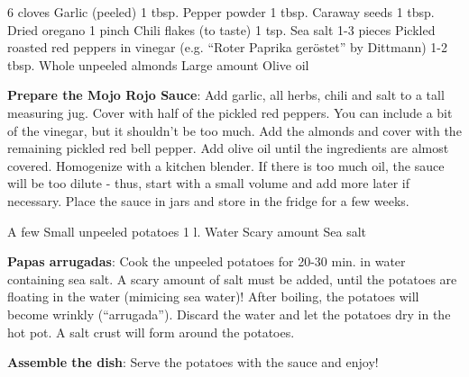 \documentclass{article}
\begin{document}

\dishType{\maindish}
\dishOther{\meat}

\begin{step}
6 cloves Garlic (peeled)
1 tbsp. Pepper powder
1 tbsp. Caraway seeds
1 tbsp. Dried oregano
1 pinch Chili flakes (to taste)
1 tsp. Sea salt
1-3 pieces Pickled roasted red peppers in vinegar (e.g. “Roter Paprika geröstet” by Dittmann)
1-2 tbsp. Whole unpeeled almonds
Large amount Olive oil


\method
\textbf{Prepare the Mojo Rojo Sauce}: Add garlic, all herbs, chili and salt to a tall measuring jug. Cover with half of the pickled red peppers. You can include a bit of the vinegar, but it shouldn't be too much. Add the almonds and cover with the remaining pickled red bell pepper. Add olive oil until the ingredients are almost covered. Homogenize with a kitchen blender. If there is too much oil, the sauce will be too dilute - thus, start with a small volume and add more later if necessary. Place the sauce in jars and store in the fridge for a few weeks.
\end{step}

\begin{step}
A few Small unpeeled potatoes 
1 l. Water
Scary amount Sea salt

\method
\textbf{Papas arrugadas}: Cook the unpeeled potatoes for 20-30 min. in water containing sea salt. A scary amount of salt must be added, until the potatoes are floating in the water (mimicing sea water)! After boiling, the potatoes will become wrinkly (“arrugada”). Discard the water and let the potatoes dry in the hot pot. A salt crust will form around the potatoes.

\textbf{Assemble the dish}: Serve the potatoes with the sauce and enjoy!
\end{step}
\vspace{-0.6cm}


\end{document}
